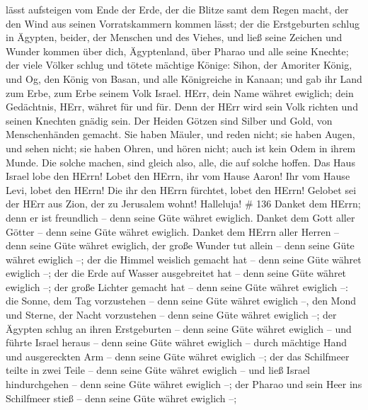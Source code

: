 lässt aufsteigen vom Ende der Erde, der die Blitze samt dem Regen macht,
der den Wind aus seinen Vorratskammern kommen lässt;  der
die Erstgeburten schlug in Ägypten, beider, der Menschen und des Viehes,
 und ließ seine Zeichen und Wunder kommen über dich,
Ägyptenland, über Pharao und alle seine Knechte;  der viele
Völker schlug und tötete mächtige Könige:  Sihon, der
Amoriter König, und Og, den König von Basan, und alle Königreiche in
Kanaan;  und gab ihr Land zum Erbe, zum Erbe seinem Volk
Israel.  HErr, dein Name währet ewiglich; dein Gedächtnis,
HErr, währet für und für.  Denn der HErr wird sein Volk
richten und seinen Knechten gnädig sein.  Der Heiden Götzen
sind Silber und Gold, von Menschenhänden gemacht.  Sie
haben Mäuler, und reden nicht; sie haben Augen, und sehen nicht;
 sie haben Ohren, und hören nicht; auch ist kein Odem in
ihrem Munde.  Die solche machen, sind gleich also, alle,
die auf solche hoffen.  Das Haus Israel lobe den HErrn!
Lobet den HErrn, ihr vom Hause Aaron!  Ihr vom Hause Levi,
lobet den HErrn! Die ihr den HErrn fürchtet, lobet den HErrn!
 Gelobet sei der HErr aus Zion, der zu Jerusalem wohnt!
Halleluja! \# 136  Danket dem HErrn; denn er ist freundlich
-- denn seine Güte währet ewiglich.  Danket dem Gott aller
Götter -- denn seine Güte währet ewiglich.  Danket dem HErrn
aller Herren -- denn seine Güte währet ewiglich,  der große
Wunder tut allein -- denn seine Güte währet ewiglich --; 
der die Himmel weislich gemacht hat -- denn seine Güte währet ewiglich
--;  der die Erde auf Wasser ausgebreitet hat -- denn seine
Güte währet ewiglich --;  der große Lichter gemacht hat --
denn seine Güte währet ewiglich --:  die Sonne, dem Tag
vorzustehen -- denn seine Güte währet ewiglich --,  den Mond
und Sterne, der Nacht vorzustehen -- denn seine Güte währet ewiglich --;
 der Ägypten schlug an ihren Erstgeburten -- denn seine
Güte währet ewiglich --  und führte Israel heraus -- denn
seine Güte währet ewiglich --  durch mächtige Hand und
ausgereckten Arm -- denn seine Güte währet ewiglich --; 
der das Schilfmeer teilte in zwei Teile -- denn seine Güte währet
ewiglich --  und ließ Israel hindurchgehen -- denn seine
Güte währet ewiglich --;  der Pharao und sein Heer ins
Schilfmeer stieß -- denn seine Güte währet ewiglich --; 
